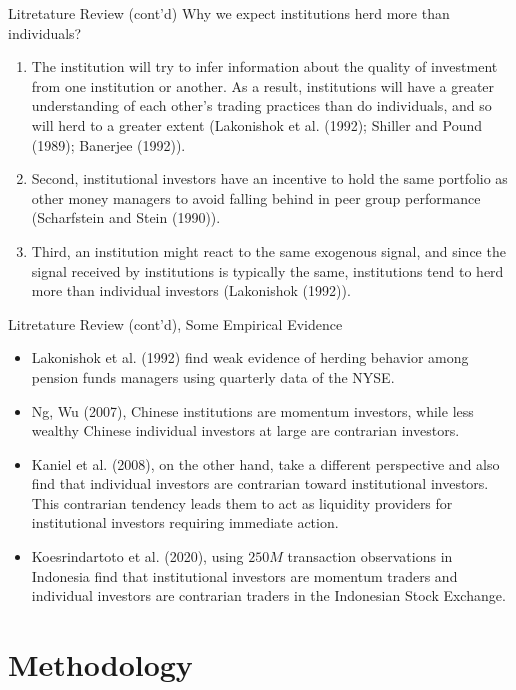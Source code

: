 \documentclass{beamer}
\begin{document}
\begin{frame}{Litretature Review (cont'd)}
    Why we expect institutions herd more than individuals?
    \begin{enumerate}
        \item The institution will try to infer information about the quality of investment from one institution or another. As a result, institutions will have a greater understanding of each other’s trading practices than do individuals, and so will herd to a greater extent (Lakonishok et al. (1992); Shiller and Pound (1989); Banerjee (1992)).
        \item Second, institutional investors have an incentive to hold the same portfolio as other money managers to avoid falling behind in peer group performance (Scharfstein and Stein (1990)).
        \item Third, an institution might react to the same exogenous signal, and since the signal received by institutions is typically the same, institutions tend to herd more than individual investors (Lakonishok (1992)).
    \end{enumerate}
\end{frame}

\begin{frame}{Litretature Review (cont'd), Some Empirical Evidence}
    \begin{itemize}
        \item Lakonishok et al. (1992) find weak evidence of herding behavior among pension funds managers using quarterly data of the NYSE.
        \item Ng, Wu (2007), Chinese institutions are momentum investors, while less wealthy Chinese individual investors at large are contrarian investors.
        \item Kaniel et al. (2008), on the other hand, take a different perspective and also find that individual investors are contrarian toward institutional investors. This contrarian tendency leads them to act as liquidity providers for institutional investors requiring immediate action.
        \item Koesrindartoto et al. (2020), using \(250 M\) transaction observations in Indonesia find that institutional investors are momentum traders and individual investors are contrarian traders in the Indonesian Stock Exchange.
    \end{itemize}
\end{frame}


\section{Methodology}
\end{document}
